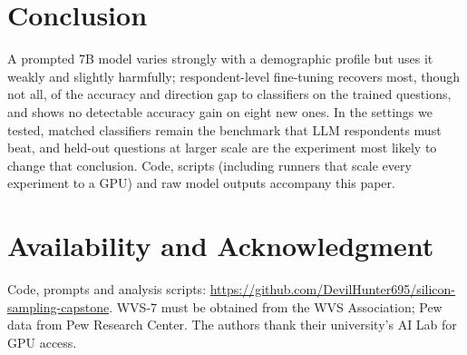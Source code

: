 \documentclass[conference]{IEEEtran}
\begin{document}
\section{Conclusion}

A prompted 7B model varies strongly with a demographic profile but uses it weakly and slightly harmfully; respondent-level fine-tuning recovers most, though not all, of the accuracy and direction gap to classifiers on the trained questions, and shows no detectable accuracy gain on eight new ones. In the settings we tested, matched classifiers remain the benchmark that LLM respondents must beat, and held-out questions at larger scale are the experiment most likely to change that conclusion. Code, scripts (including runners that scale every experiment to a GPU) and raw model outputs accompany this paper.

\section*{Availability and Acknowledgment}
Code, prompts and analysis scripts: \url{https://github.com/DevilHunter695/silicon-sampling-capstone}. WVS-7 must be obtained from the WVS Association; Pew data from Pew Research Center. The authors thank their university's AI Lab for GPU access.
\end{document}
